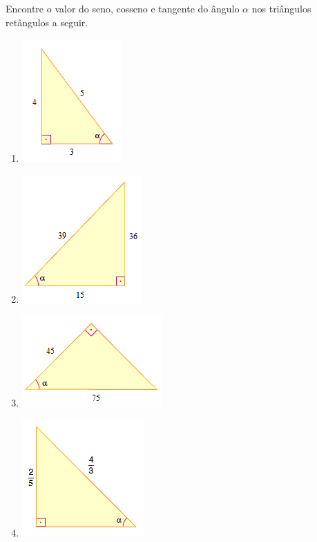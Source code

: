 \item Encontre o valor do seno, cosseno e tangente do ângulo $\alpha$ nos triângulos retângulos a seguir.
\begin{multicols}{2}
\begin{enumerate}
	\item \includegraphics[scale=0.7]{figuras/fig87.png}
	\item \includegraphics[scale=0.7]{figuras/fig88.png}
	\item \includegraphics[scale=0.7]{figuras/fig89.png}
	\item \includegraphics[scale=0.7]{figuras/fig90.png}
\end{enumerate}
\end{multicols}

